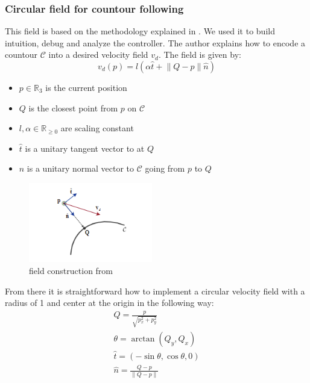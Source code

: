 \subsubsection{Circular field for countour following}
This field is based on the methodology explained in \cite{asl2019assistive}. We used it to build intuition, debug and analyze the controller.
The author explains how to encode a countour $\mathcal{C}$ into a desired velocity field $v_d$.
The field is given by: 
\begin{equation}
    v_d(p) = l(\alpha \hat{t} + \lVert Q-p \rVert \hat{n}) 
\end{equation}
\begin{itemize}
    \item $p\in \mathbb{R}_3$ is the current position
    \item $Q$ is the closest point from $p$ on $\mathcal{C}$
    \item $l , \alpha \in \mathbb{R}_{\geq 0}$ are scaling constant
    \item $\hat{t}$ is a unitary tangent vector to  at $Q$
    \item $\hat{n}$ is a unitary normal vector to $\mathcal{C}$ going from $p$ to $Q$
\end{itemize}

\begin{figure}[h!]
    \centering
    \includegraphics[width=0.48\textwidth]{Images/fieldconstruction.png}
    \caption{field construction from \cite{asl2019assistive}}
    \label{fig:fieldconstruction}
\end{figure} 

From there it is straightforward how to implement a circular velocity field with a radius of 1 and center at the origin in the following way:
\begin{align}
    Q = \frac{p}{\sqrt{p_x^2 + p_y^2}}\\
    \theta = \arctan(Q_y, Q_x) \\
    \hat{t} = (-\sin{\theta}, \cos{\theta}, 0) \\
    \hat{n} = \frac{Q-p}{\lVert Q-p \rVert}
\end{align}
